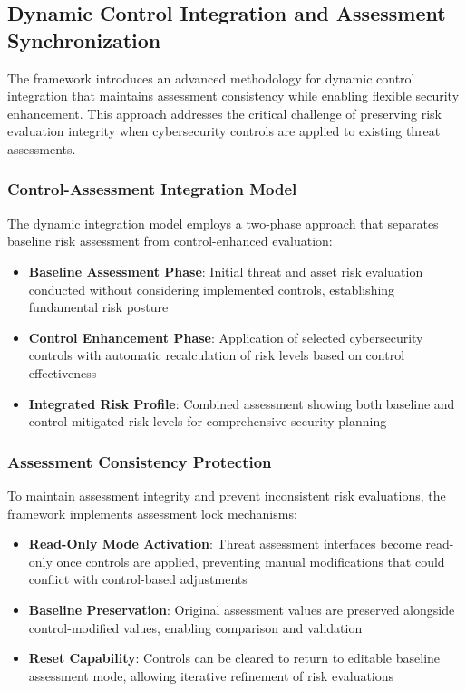 \documentclass[binding=0.6cm]{sapthesis}
\begin{document}
\subsection{Dynamic Control Integration and Assessment Synchronization}

The framework introduces an advanced methodology for dynamic control integration that maintains assessment consistency while enabling flexible security enhancement. This approach addresses the critical challenge of preserving risk evaluation integrity when cybersecurity controls are applied to existing threat assessments.

\subsubsection{Control-Assessment Integration Model}

The dynamic integration model employs a two-phase approach that separates baseline risk assessment from control-enhanced evaluation:

\begin{itemize}
    \item \textbf{Baseline Assessment Phase}: Initial threat and asset risk evaluation conducted without considering implemented controls, establishing fundamental risk posture
    \item \textbf{Control Enhancement Phase}: Application of selected cybersecurity controls with automatic recalculation of risk levels based on control effectiveness
    \item \textbf{Integrated Risk Profile}: Combined assessment showing both baseline and control-mitigated risk levels for comprehensive security planning
\end{itemize}

\subsubsection{Assessment Consistency Protection}

To maintain assessment integrity and prevent inconsistent risk evaluations, the framework implements assessment lock mechanisms:

\begin{itemize}
    \item \textbf{Read-Only Mode Activation}: Threat assessment interfaces become read-only once controls are applied, preventing manual modifications that could conflict with control-based adjustments
    \item \textbf{Baseline Preservation}: Original assessment values are preserved alongside control-modified values, enabling comparison and validation
    \item \textbf{Reset Capability}: Controls can be cleared to return to editable baseline assessment mode, allowing iterative refinement of risk evaluations
\end{itemize}
\end{document}
